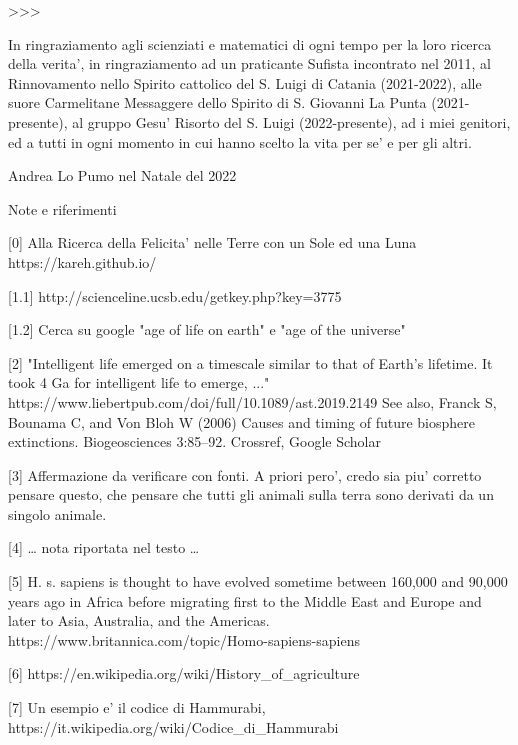 >>>



In ringraziamento agli scienziati e matematici di ogni tempo per la loro ricerca della verita', in ringraziamento ad un praticante Sufista incontrato nel 2011, al Rinnovamento nello Spirito cattolico del S. Luigi di Catania (2021-2022), alle suore Carmelitane Messaggere dello Spirito di S. Giovanni La Punta (2021-presente), al gruppo Gesu' Risorto del S. Luigi (2022-presente), ad i miei genitori, ed a tutti in ogni momento in cui hanno scelto la vita per se' e per gli altri.

												Andrea Lo Pumo
											   nel Natale del 2022


Note e riferimenti

[0] Alla Ricerca della Felicita' nelle Terre con un Sole ed una Luna https://kareh.github.io/

[1.1] http://scienceline.ucsb.edu/getkey.php?key=3775

[1.2] Cerca su google "age of life on earth" e "age of the universe"

[2] "Intelligent life emerged on a timescale similar to that of Earth's lifetime. It took 4 Ga for intelligent life to emerge, ..."
    https://www.liebertpub.com/doi/full/10.1089/ast.2019.2149  See also, Franck S, Bounama C, and Von Bloh W (2006) Causes and timing of future biosphere extinctions. Biogeosciences 3:85–92. Crossref, Google Scholar

[3] Affermazione da verificare con fonti. A priori pero', credo sia piu' corretto pensare questo, che pensare che tutti gli animali sulla terra sono derivati da un singolo animale.

[4] … nota riportata nel testo … 

[5] H. s. sapiens is thought to have evolved sometime between 160,000 and 90,000 years ago in Africa before migrating first to the Middle East and Europe and later to Asia, Australia, and the Americas. https://www.britannica.com/topic/Homo-sapiens-sapiens

[6] https://en.wikipedia.org/wiki/History_of_agriculture

[7] Un esempio e' il codice di Hammurabi, https://it.wikipedia.org/wiki/Codice_di_Hammurabi

